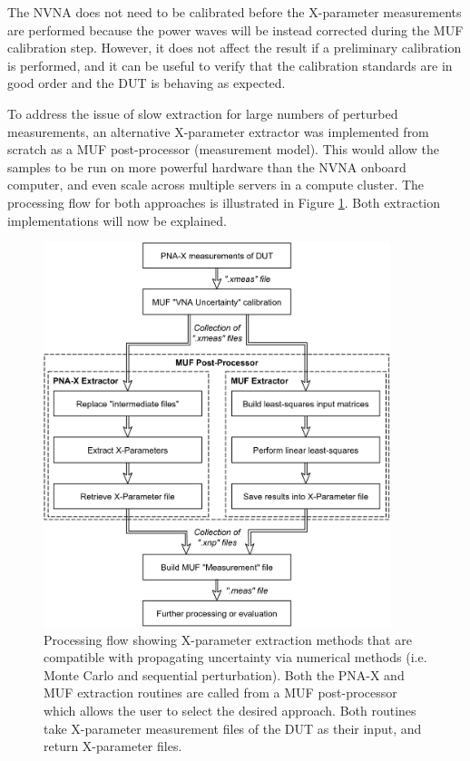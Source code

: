 \documentclass[../thesis/thesis.tex]{subfiles}
\begin{document}
\begin{refsection}
The NVNA does not need to be calibrated before the X-parameter measurements are performed because the power waves will be instead corrected during the MUF calibration step. However, it does not affect the result if a preliminary calibration is performed, and it can be useful to verify that the calibration standards are in good order and the DUT is behaving as expected.

To address the issue of slow extraction for large numbers of perturbed measurements, an alternative  X-parameter extractor was implemented from scratch as a MUF post-processor (measurement model). This would allow the samples to be run on more powerful hardware than the NVNA onboard computer, and even scale across multiple servers in a compute cluster. The processing flow for both approaches is illustrated in Figure \ref{ch5_fig_uncproc}. Both extraction implementations will now be explained.

\begin{figure}
	\centering
	\includegraphics[width=0.9\textwidth]{uncproc}
	\caption[X-parameter uncertainty processing flow.]{Processing flow showing X-parameter extraction methods that are compatible with propagating uncertainty via numerical methods (i.e. Monte Carlo and sequential perturbation). Both the PNA-X and MUF extraction routines are called from a MUF post-processor which allows the user to select the desired approach. Both routines take X-parameter measurement files of the DUT as their input, and return X-parameter files.}
	\label{ch5_fig_uncproc}
\end{figure}


\end{refsection}
\end{document}
